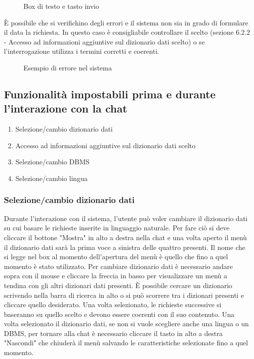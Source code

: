 \begin{figure}[H]
  \centering
  \caption{Box di testo e tasto invio}
\end{figure}

È possibile che si verifichino degli errori e il sistema non sia in grado di formulare il  data la richiesta. In questo caso è consigliabile controllare il  scelto (sezione 6.2.2 - Accesso ad informazioni aggiuntive sul dizionario dati scelto) o se l'interrogazione utilizza i termini corretti e coerenti.

\begin{figure}[H]
  \centering
  \caption{Esempio di errore nel sistema}
\end{figure}

\subsection{Funzionalità impostabili prima e durante l'interazione con la chat}

\begin{enumerate}
  \item Selezione/cambio dizionario dati
  \item Accesso ad informazioni aggiuntive sul dizionario dati scelto
  \item Selezione/cambio DBMS
  \item Selezione/cambio lingua
\end{enumerate}

\subsubsection{Selezione/cambio dizionario dati}

Durante l'interazione con il sistema, l'utente può voler cambiare il dizionario dati su cui basare le richieste inserite in linguaggio naturale. Per fare ciò si deve cliccare il bottone "Mostra" in alto a destra nella chat e una volta aperto il menù il dizionario dati sarà la prima voce a sinistra delle quattro presenti. Il nome che si legge nel box al momento dell'apertura del menù è quello che fino a quel momento è stato utilizzato. Per cambiare dizionario dati è necessario andare sopra con il mouse e cliccare la freccia in basso per visualizzare un menù a tendina con gli altri dizionari dati presenti. È possibile cercare un dizionario scrivendo nella barra di ricerca in alto o si può scorrere tra i dizionari presenti e cliccare quello desiderato. Una volta selezionato, le richieste successive si baseranno su quello scelto e devono essere coerenti con il suo contenuto. Una volta selezionato il dizionario dati, se non si vuole scegliere anche una lingua o un DBMS, per tornare alla chat è necessario cliccare il tasto in alto a destra "Nascondi" che chiuderà il menù salvando le caratteristiche selezionate fino a quel momento.


